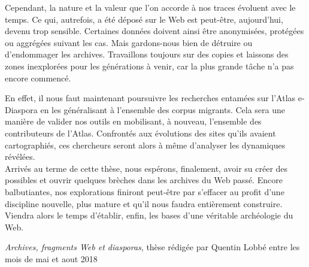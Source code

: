 \documentclass[symmetric,justified,marginals=raggedouter]{tufte-book}
\begin{document}
Cependant, la nature et la valeur que l'on accorde à nos traces évoluent avec le temps. Ce qui, autrefois, a été déposé sur le Web est peut-être, aujourd'hui, devenu trop sensible. Certaines données doivent ainsi être anonymisées, protégées ou aggrégées suivant les cas. Mais gardons-nous bien de détruire ou d'endommager les archives. Travaillons toujours sur des copies et laissons des zones inexplorées pour les générations à venir, car la plus grande tâche n'a pas encore commencé.

En effet, il nous faut maintenant poursuivre les recherches entamées sur l'Atlas e-Diaspora en les généralisant à l'ensemble des corpus migrants. Cela sera une manière de valider nos outils en mobilisant, à nouveau, l'ensemble des contributeurs de l'Atlas. Confrontés aux évolutions des sites qu'ils avaient cartographiés, ces chercheurs seront alors à même d'analyser les dynamiques révélées.\\

\noindent Arrivés au terme de cette thèse, nous espérons, finalement, avoir su créer des possibles et ouvrir quelques brèches dans les archives du Web passé. Encore balbutiantes, nos explorations finiront peut-être par s'effacer au profit d'une discipline nouvelle, plus mature et qu'il nous faudra entièrement construire. Viendra alors le temps d'établir, enfin, les bases d'une véritable archéologie du Web.   



\backmatter





\vfill 

\begin{fullwidth}
\hspace*{0.5em}\textit{Archives, fragments Web et diasporas}, thèse rédigée par Quentin Lobbé entre les mois de mai et aout 2018
\end{fullwidth}

\end{document}
